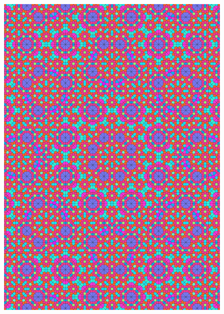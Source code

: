 \documentclass[text.tex]{subfiles}
\begin{document}
\begin{figure}[h!]
\centering
\includegraphics[width=1\textwidth]{img/results/octagon/quasi_polygon-octagon_131066_(-2_3alpha_4).pdf}
\end{figure}
\end{document}
